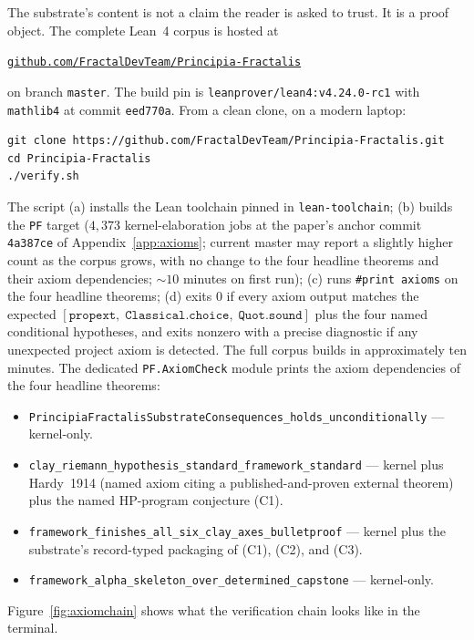 \documentclass[11pt,a4paper]{amsart}
\theoremstyle{plain}
\theoremstyle{definition}
\begin{document}
The substrate's content is not a claim the reader is asked to trust. It is a proof object. The complete Lean~4 corpus is hosted at
\begin{center}
\href{https://github.com/FractalDevTeam/Principia-Fractalis}{\texttt{github.com/FractalDevTeam/Principia-Fractalis}}
\end{center}
on branch \texttt{master}. The build pin is \texttt{leanprover/lean4:v4.24.0-rc1} with \texttt{mathlib4} at commit \texttt{eed770a}. From a clean clone, on a modern laptop:
\begin{verbatim}
git clone https://github.com/FractalDevTeam/Principia-Fractalis.git
cd Principia-Fractalis
./verify.sh
\end{verbatim}
The script (a) installs the Lean toolchain pinned in \texttt{lean-toolchain}; (b) builds the \texttt{PF} target ($4{,}373$ kernel-elaboration jobs at the paper's anchor commit \texttt{4a387ce} of Appendix~\ref{app:axioms}; current master may report a slightly higher count as the corpus grows, with no change to the four headline theorems and their axiom dependencies; $\sim 10$ minutes on first run); (c) runs \texttt{\#print axioms} on the four headline theorems; (d) exits 0 if every axiom output matches the expected $[\texttt{propext},\;\texttt{Classical.choice},\;\texttt{Quot.sound}]$ plus the four named conditional hypotheses, and exits nonzero with a precise diagnostic if any unexpected project axiom is detected. The full corpus builds in approximately ten minutes. The dedicated \texttt{PF.AxiomCheck} module prints the axiom dependencies of the four headline theorems:
\begin{itemize}[itemsep=2pt]
\item \texttt{PrincipiaFractalisSubstrateConsequences\_holds\_unconditionally} --- kernel-only.
\item \texttt{clay\_riemann\_hypothesis\_standard\_framework\_standard} --- kernel plus Hardy~1914 (named axiom citing a published-and-proven external theorem) plus the named HP-program conjecture (C1).
\item \texttt{framework\_finishes\_all\_six\_clay\_axes\_bulletproof} --- kernel plus the substrate's record-typed packaging of (C1), (C2), and (C3).
\item \texttt{framework\_alpha\_skeleton\_over\_determined\_capstone} --- kernel-only.
\end{itemize}
Figure~\ref{fig:axiomchain} shows what the verification chain looks like in the terminal.
\end{document}
